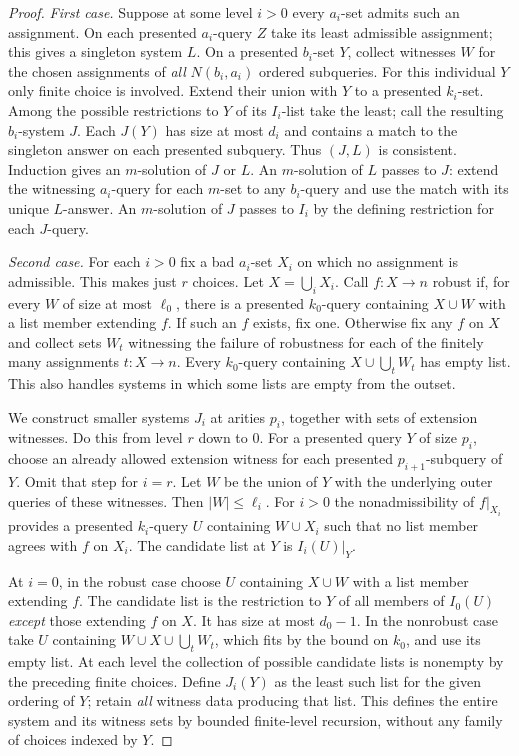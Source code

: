\documentclass[11pt]{article}
\begin{document}
\begin{proof}
\emph{First case.} Suppose at some level $i>0$ every $a_i$-set admits such an assignment. On each presented $a_i$-query $Z$ take its least admissible assignment; this gives a singleton system $L$. On a presented $b_i$-set $Y$, collect witnesses $W$ for the chosen assignments of \emph{all} $N(b_i,a_i)$ ordered subqueries. For this individual $Y$ only finite choice is involved. Extend their union with $Y$ to a presented $k_i$-set. Among the possible restrictions to $Y$ of its $I_i$-list take the least; call the resulting $b_i$-system $J$. Each $J(Y)$ has size at most $d_i$ and contains a match to the singleton answer on each presented subquery. Thus $(J,L)$ is consistent. Induction gives an $m$-solution of $J$ or $L$. An $m$-solution of $L$ passes to $J$: extend the witnessing $a_i$-query for each $m$-set to any $b_i$-query and use the match with its unique $L$-answer. An $m$-solution of $J$ passes to $I_i$ by the defining restriction for each $J$-query.

\emph{Second case.} For each $i>0$ fix a bad $a_i$-set $X_i$ on which no assignment is admissible. This makes just $r$ choices. Let $X=\bigcup_i X_i$. Call $f:X\to n$ robust if, for every $W$ of size at most $\ell_0$, there is a presented $k_0$-query containing $X\cup W$ with a list member extending $f$. If such an $f$ exists, fix one. Otherwise fix any $f$ on $X$ and collect sets $W_t$ witnessing the failure of robustness for each of the finitely many assignments $t:X\to n$. Every $k_0$-query containing $X\cup\bigcup_tW_t$ has empty list. This also handles systems in which some lists are empty from the outset.

We construct smaller systems $J_i$ at arities $p_i$, together with sets of extension witnesses. Do this from level $r$ down to $0$. For a presented query $Y$ of size $p_i$, choose an already allowed extension witness for each presented $p_{i+1}$-subquery of $Y$. Omit that step for $i=r$. Let $W$ be the union of $Y$ with the underlying outer queries of these witnesses. Then $|W|\leq\ell_i$. For $i>0$ the nonadmissibility of $f|_{X_i}$ provides a presented $k_i$-query $U$ containing $W\cup X_i$ such that no list member agrees with $f$ on $X_i$. The candidate list at $Y$ is $I_i(U)|_Y$.

At $i=0$, in the robust case choose $U$ containing $X\cup W$ with a list member extending $f$. The candidate list is the restriction to $Y$ of all members of $I_0(U)$ \emph{except} those extending $f$ on $X$. It has size at most $d_0-1$. In the nonrobust case take $U$ containing $W\cup X\cup\bigcup_t W_t$, which fits by the bound on $k_0$, and use its empty list. At each level the collection of possible candidate lists is nonempty by the preceding finite choices. Define $J_i(Y)$ as the least such list for the given ordering of $Y$; retain \emph{all} witness data producing that list. This defines the entire system and its witness sets by bounded finite-level recursion, without any family of choices indexed by $Y$.


\end{proof}
\end{document}
